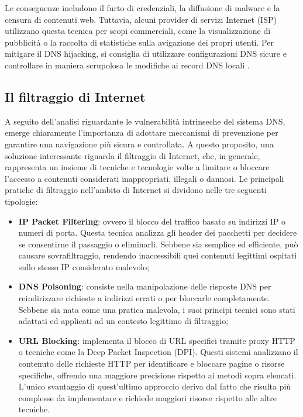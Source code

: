 Le conseguenze includono il furto di credenziali, la diffusione di malware e la censura di contenuti web. Tuttavia, alcuni provider di servizi Internet (ISP) utilizzano questa tecnica per scopi commerciali, come la visualizzazione di pubblicità o la raccolta di statistiche sulla avigazione dei propri utenti. Per mitigare il DNS hijacking, si consiglia di utilizzare configurazioni DNS sicure e controllare in maniera scrupolosa le modifiche ai record DNS locali \cite{hudaib2014dns}.

\subsection{Il filtraggio di Internet}
A seguito dell'analisi riguardante le vulnerabilità intrinseche del sistema DNS, emerge chiaramente l'importanza di adottare meccanismi di prevenzione per garantire una navigazione più sicura e controllata. A questo proposito, una soluzione interessante riguarda il filtraggio di Internet, che, in generale, rappresenta un insieme di tecniche e tecnologie volte a limitare o bloccare l'accesso a contenuti considerati inappropriati, illegali o dannosi. Le principali pratiche di filtraggio nell'ambito di Internet si dividono nelle tre seguenti tipologie:
\begin{itemize}
  \item \textbf{IP Packet Filtering}: ovvero il blocco del traffico basato su indirizzi IP o numeri di porta. Questa tecnica analizza gli header dei pacchetti per decidere se consentirne il passaggio o eliminarli. Sebbene sia semplice ed efficiente, può causare sovrafiltraggio, rendendo inaccessibili quei contenuti legittimi ospitati sullo stesso IP considerato malevolo;

  \item \textbf{DNS Poisoning}: consiste nella manipolazione delle risposte DNS per reindirizzare richieste a indirizzi errati o per bloccarle completamente. Sebbene sia nata come una pratica malevola, i suoi principi tecnici sono stati adattati ed applicati ad un contesto legittimo di filtraggio;

  \item \textbf{URL Blocking}: implementa il blocco di URL specifici tramite proxy HTTP o tecniche come la Deep Packet Inspection (DPI). Questi sistemi analizzano il contenuto delle richieste HTTP per identificare e bloccare pagine o risorse specifiche, offrendo una maggiore precisione rispetto ai metodi sopra elencati. L'unico svantaggio di quest'ultimo approccio deriva dal fatto che risulta più complesse da implementare e richiede maggiori risorse rispetto alle altre tecniche.
\end{itemize}

